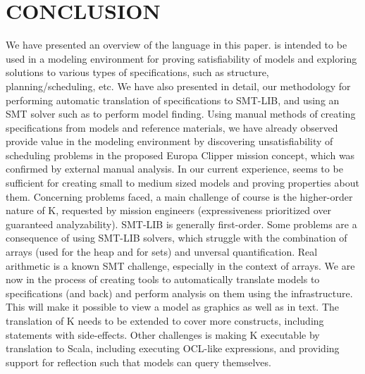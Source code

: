 \section{CONCLUSION}
\label{sec:conclusion}

We have presented an overview of the \Klang{} language in this
paper. \Klang{} is intended to be used in a modeling environment for
proving satisfiability of \sysml{} models and exploring solutions to
various types of specifications, such as structure,
planning/scheduling, etc. We have also presented in detail, our
methodology for performing automatic translation of \Klang{}
specifications to SMT-LIB, and using an SMT solver such as \zthree{}
to perform model finding. Using manual methods of creating \Klang{}
specifications from \sysml{} models and reference materials, we have
already observed \Klang{} provide value in the modeling environment by
discovering unsatisfiability of scheduling problems in the proposed
Europa Clipper mission concept, which was confirmed by external manual
analysis.  In our current experience, \Klang{} seems to be sufficient
for creating small to medium sized \sysml{} models and proving
properties about them.
%
Concerning problems faced, a main challenge of course is the
higher-order nature of K, requested by mission engineers
(expressiveness prioritized over guaranteed analyzability). 
SMT-LIB is generally
first-order.  Some problems are a consequence of using SMT-LIB
solvers, which struggle with the combination of arrays (used for the
heap and for sets) and unversal quantification. Real arithmetic is a
known SMT challenge, especially in the context of arrays.
%
We are now in the process of creating tools to automatically translate
\sysml{} models to \Klang{} specifications (and back) and perform analysis on
them using the \Klang{} infrastructure. This will make it possible to view
a model as graphics as well as in text. The translation of K needs to
be extended to cover more constructs, including statements with
side-effects. Other challenges is making K executable by translation
to Scala, including executing OCL-like expressions,
and providing support for reflection such that models can query themselves.


